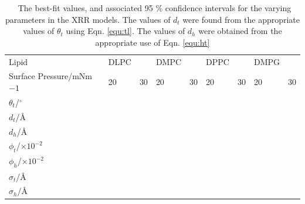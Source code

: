\documentclass[twoside,twocolumn,9pt]{article}
\begin{document}
\begin{table}
	\small
	\caption{\ The best-fit values, and associated 95 \% confidence intervals for the varying parameters in the XRR models. The values of $d_t$ were found from the appropriate values of $\theta_t$ using Eqn. \ref{equ:tl}. The values of $d_h$ were obtained from the appropriate use of Eqn. \ref{equ:ht}}
	\label{tab:liptab}
	\begin{tabular*}{\textwidth}{@{\extracolsep{\fill}}lllllllll}
		\hline
		Lipid & DLPC & & DMPC & & DPPC & & DMPG & \\
		Surface Pressure/mNm${-1}$ & 20 & 30 & 20 & 30 & 20 & 30 & 20 & 30 \\
		\hline
		$\theta_t$/$^\circ$ &  &  &  &  &  &  &  &  \\
		$d_t$/\AA &  &  &  &  &  &  &  &  \\
		$d_h$/\AA &  &  &  &  &  &  &  &  \\
		$\phi_t$/$\times10^{-2}$ &  &  &  &  &  &  &  &  \\
		$\phi_h$/$\times10^{-2}$ &  &  &  &  &  &  &  &  \\
		$\sigma_t$/\AA &  &  &  &  &  &  &  &  \\
		$\sigma_h$/\AA &  &  &  &  &  &  &  &  \\
		\hline
	\end{tabular*}
\end{table}
\end{document}
